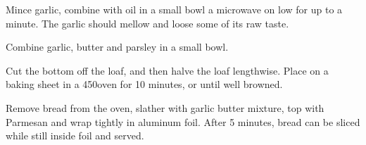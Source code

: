 \begin{recipe}


Mince garlic, combine with oil in a small bowl a microwave on low for up to a minute. The garlic should mellow and loose some of its raw taste.


Combine garlic, butter and parsley in a small bowl.


Cut the bottom off the loaf, and then halve the loaf lengthwise. Place on a baking sheet in a 450\degree oven for 10 minutes, or until well browned.


Remove bread from the oven, slather with garlic butter mixture, top with Parmesan and wrap tightly in aluminum foil.
After 5 minutes, bread can be sliced while still inside foil and served.

\end{recipe}
